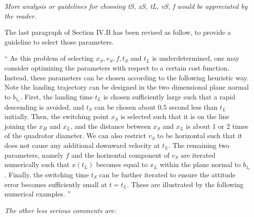 \documentclass[11pt]{article}
\newenvironment{correction}{\begin{list}{}{\setlength{\leftmargin}{1cm}\setlength{\rightmargin}{1cm}}\vspace{\parsep}\item[]``}{''\end{list}}
\begin{document}
\begin{itemize}
\item
\textit{
More analysis or guidelines for choosing tS, xS, tL, vS, f would be appreciated by the reader.
}

The last paragraph of Section IV.B has been revised as follow, to provide a guideline to select those parameters.

\begin{correction}
As this problem of selecting $x_S,v_S,f,t_S$ and $t_L$ is underdetermined, one may consider optimizing the parameters with respect to a certain cost function. Instead, these parameters can be chosen according to the following heuristic way. Note the landing trajectory can be designed in the two dimensional plane normal to $b_{1_c}$. First, the landing time $t_L$ is chosen sufficiently large such that a rapid descending is avoided, and $t_S$ can be chosen about 0.5 second less than $t_L$ initially. Then, the switching point $x_S$ is selected such that it is on the line joining the $x_H$ and $x_L$, and the distance between $x_S$ and $x_L$ is about 1 or 2 times of the quadrotor diameter. We can also restrict $v_S$ to be horizontal such that it does not cause any additional downward velocity at $t_L$. The remaining two parameters, namely $f$ and the horizontal component of $v_S$ are iterated numerically such that $x(t_L)$ becomes equal to $x_L$ within the plane normal to $b_{1_c}$. Finally, the switching time $t_S$ can be further iterated to ensure the attitude error becomes sufficiently small at $t=t_L$. These are illustrated by the following numerical examples. 
\end{correction}



\end{itemize}

\noindent\textit{The other less serious comments are:}
\end{document}
